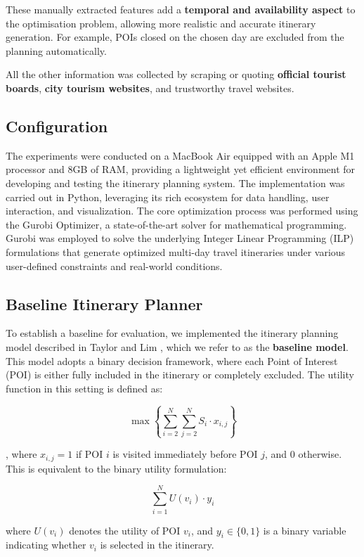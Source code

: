 These manually extracted features add a \textbf{temporal and availability aspect} to the optimisation problem, allowing more realistic and accurate itinerary generation. For example, POIs closed on the chosen day are excluded from the planning automatically.

All the other information was collected by scraping or quoting \textbf{official tourist boards}, \textbf{city tourism websites}, and trustworthy travel websites.

\subsection{Configuration}

The experiments were conducted on a MacBook Air equipped with an Apple M1 processor and 8GB of RAM, providing a lightweight yet efficient environment for developing and testing the itinerary planning system. The implementation was carried out in Python, leveraging its rich ecosystem for data handling, user interaction, and visualization. The core optimization process was performed using the Gurobi Optimizer, a state-of-the-art solver for mathematical programming. Gurobi was employed to solve the underlying Integer Linear Programming (ILP) formulations that generate optimized multi-day travel itineraries under various user-defined constraints and real-world conditions.

\subsection{Baseline Itinerary Planner}

To establish a baseline for evaluation, we implemented the itinerary planning model described in Taylor and Lim \cite{taylor2018tour}, which we refer to as the \textbf{baseline model}. This model adopts a binary decision framework, where each Point of Interest (POI) is either fully included in the itinerary or completely excluded. The utility function in this setting is defined as:

\[
\max \left\{ \sum_{i=2}^{N} \sum_{j=2}^{N} S_i \cdot x_{i,j} \right\}
\]

, where \( x_{i,j} = 1 \) if POI \( i \) is visited immediately before POI \( j \), and 0 otherwise.  This is equivalent to the binary utility formulation:

\[
\sum_{i=1}^{N} U(v_i) \cdot y_i
\]

where \( U(v_i) \) denotes the utility of POI \( v_i \), and \( y_i \in \{0,1\} \) is a binary variable indicating whether \( v_i \) is selected in the itinerary.


